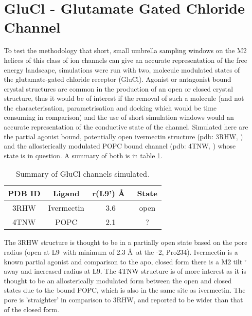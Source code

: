 \section{GluCl - Glutamate Gated Chloride Channel}

To test the methodology that short, small umbrella sampling windows on the M2 helices of this class of ion channels can give an accurate representation of the free energy landscape, simulations were run with two, molecule modulated states of the glutamate-gated chloride receptor (GluCl). Agonist or antagonist bound crystal structures are common in the production of an open or closed crystal structure, thus it would be of interest if the removal of such a molecule (and not the characterisation, parametrisation and docking which would be time consuming in comparison) and the use of short simulation windows would an accurate representation of the conductive state of the channel. Simulated here are the partial agonist bound, potentially open ivermectin structure (pdb: 3RHW, \cite{Hibbs2011}) and the allosterically modulated POPC bound channel (pdb: 4TNW, \cite{Althoff2014}) whose state is in question. A summary of both is in table \ref{table:GluCl channel}. 

\begin{table}[H]
\centering %
\begin{tabular}{ |c|c|c|c| } 
 \hline
 PDB ID & Ligand & r(L9') \AA\ & State \\  
 \hline
 3RHW & Ivermectin & 3.6 & open  \\
 \hline
 4TNW & POPC & 2.1 & ?  \\
 \hline
 \end{tabular}
\caption[Summary of GluCl channels simulated.] {Summary of GluCl channels simulated.}
\label{table:GluCl channel}
\end{table}


The 3RHW structure is thought to be in a partially open state based on the pore radius (open at L9\textquotesingle\, with minimum of 2.3 \AA\ at the -2\textquotesingle, Pro234). Ivermectin is a known partial agonist and comparison to the apo, closed form \cite{Hibbs2011} there is a M2 tilt   $^{\circ}$ away and increased radius at L9\textquotesingle. The 4TNW structure is of more interest as it is thought to be an allosterically modulated form between the open and closed states due to the bound POPC, which is also in the same site as ivermectin. The pore is 'straighter' in comparison to 3RHW, and reported to be wider than that of the closed form.


